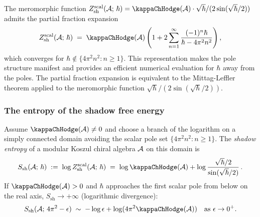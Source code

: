 \begin{remark}
The meromorphic function
$Z_{\mathrm{sh}}^{\mathrm{scal}}(\cA;\,\hbar)
= \kappaChHodge(\cA) \cdot
\sqrt{\hbar}/(2\sin(\sqrt{\hbar}/2))$ admits the partial fraction expansion
\begin{equation}%
Z_{\mathrm{sh}}^{\mathrm{scal}}(\cA;\,\hbar) \;=\; \kappaChHodge(\cA) \left( 1 + 2\sum_{n=1}^{\infty} \frac{(-1)^{n} \hbar}{\hbar - 4\pi^2 n^2} \right),
\end{equation}
which converges for $\hbar \notin \{4\pi^2 n^2 : n \geq 1\}$. This representation makes the pole structure manifest and provides an efficient numerical evaluation for $\hbar$ away from the poles. The partial fraction expansion is equivalent to the Mittag-Leffler theorem applied to the meromorphic function $\sqrt{\hbar}/(2\sin(\sqrt{\hbar}/2))$.
\end{remark}

\subsubsection{The entropy of the shadow free energy}

\begin{definition}
Assume $\kappaChHodge(\cA)\neq0$ and choose a branch of the logarithm
on a simply connected domain avoiding the scalar pole set
$\{4\pi^2n^2:n\geq1\}$. The \emph{shadow entropy} of a modular Koszul
chiral algebra $\mathcal{A}$ on this domain is
\begin{equation}%
S_{\mathrm{sh}}(\cA;\,\hbar)
\;:=\;
\log Z_{\mathrm{sh}}^{\mathrm{scal}}(\cA;\,\hbar)
\;=\;
\log\kappaChHodge(\cA)
+ \log\frac{\sqrt{\hbar}/2}{\sin(\sqrt{\hbar}/2)}\,.
\end{equation}
If $\kappaChHodge(\cA)>0$ and $\hbar$ approaches the first scalar pole
from below on the real axis, $S_{\mathrm{sh}} \to +\infty$
\textup{(}logarithmic divergence\textup{)}:
\begin{equation}%
S_{\mathrm{sh}}(\cA;\,4\pi^2 - \epsilon) \;\sim\; -\log\epsilon + \log(4\pi^2\kappaChHodge(\cA)) \quad\text{as } \epsilon \to 0^+.
\end{equation}
\end{definition}

